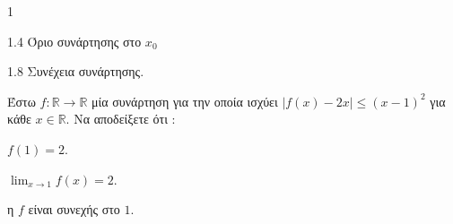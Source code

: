 \begin{ylh}{1}
    \item 1.4 Όριο συνάρτησης στο $x_0$
    \item 1.8 Συνέχεια συνάρτησης.
\end{ylh}
Έστω $f : \mathbb{R} \rightarrow \mathbb{R}$ μία συνάρτηση για την οποία ισχύει $|f(x)-2x| \leq (x-1)^2$ για κάθε $x \in \mathbb{R}$.
Να αποδείξετε ότι :
\begin{alist}
    \item $f(1)=2$. 
    \item $\lim_{x \to 1} f(x)=2$. 
    \item η $f$ είναι συνεχής στο $1$. 
\end{alist}